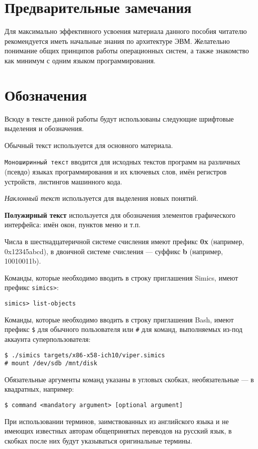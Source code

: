 \section{Предварительные замечания}

Для максимально эффективного усвоения материала данного пособия читателю рекомендуется иметь начальные знания по архитектуре ЭВМ. Желательно понимание общих принципов работы операционных систем, а также знакомство как  минимум с одним языком программирования.

\section{Обозначения}

Всюду в тексте данной работы будут использованы следующие шрифтовые выделения и обозначения.

\begin{itemize*}
    \item Обычный текст используется для основного материала.
    \item \texttt{Моноширинный текст} вводится для исходных текстов программ на различных (псевдо) языках программирования и их ключевых слов,  имён регистров устройств, листингов машинного кода.
    \item \textit{Наклонный текст} используется для выделения новых понятий.
    \item \textbf{Полужирный текст} используется для обозначения элементов графического интерфейса: имён окон, пунктов меню и т.п.
    \item Числа в шестнадцатеричной системе счисления имеют префикс \textbf{0x} (например, 0x12345abcd), в двоичной системе счисления --- суффикс \textbf{b} (например, 10010011b).
    \item Команды, которые необходимо вводить в строку приглашения Simics, имеют префикс \texttt{simics>}:
    \begin{lstlisting}
simics> list-objects
    \end{lstlisting}
    \item Команды, которые необходимо вводить в строку приглашения Bash, имеют префикс \texttt{\$} для обычного пользователя или \texttt{\#} для команд, выполняемых из-под аккаунта суперпользователя:
    \begin{lstlisting}
$ ./simics targets/x86-x58-ich10/viper.simics
# mount /dev/sdb /mnt/disk
    \end{lstlisting}

    \item Обязательные аргументы команд указаны в угловых скобках, необязательные --- в квадратных, например:
    \begin{lstlisting}
$ command <mandatory argument> [optional argument]
    \end{lstlisting}

\end{itemize*}

При использовании терминов, заимствованных из английского языка и не имеющих известных авторам общепринятых переводов на русский язык, в скобках после них будут указываться оригинальные термины.
